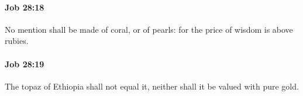 		\paragraph{Job 28:18} %
			\label{JOB-28-18}

			No mention shall be made of coral, or of pearls: for the price of wisdom is above rubies.


		\paragraph{Job 28:19} %
			\label{JOB-28-19}

			The topaz of Ethiopia shall not equal it, neither shall it be valued with pure gold.


